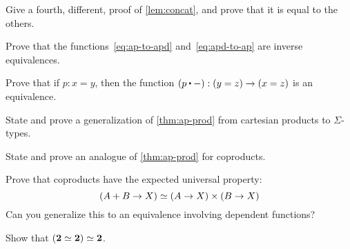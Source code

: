 \begin{ex}
  Give a fourth, different, proof of \autoref{lem:concat}, and prove that it is equal to the others.
\end{ex}

\begin{ex}
  Prove that the functions~\eqref{eq:ap-to-apd} and~\eqref{eq:apd-to-ap} are inverse equivalences.
\end{ex}

\begin{ex}\label{ex:equiv-concat}
  Prove that if $p:x=y$, then the function $(p\ct -):(y=z) \to (x=z)$ is an equivalence.
\end{ex}

\begin{ex}\label{ex:ap-sigma}
  State and prove a generalization of \autoref{thm:ap-prod} from cartesian products to $\Sigma$-types.
\end{ex}

\begin{ex}
  State and prove an analogue of \autoref{thm:ap-prod} for coproducts.
\end{ex}

\begin{ex}\label{ex:coprod-ump}
  Prove that coproducts have the expected universal property:
  \[ (A+B \to X) \simeq (A\to X)\times (B\to X) \]
  Can you generalize this to an equivalence involving dependent functions?
\end{ex}

\begin{ex}\label{ex:eqvboolbool}
  Show that $(\mathbf{2} \simeq \mathbf{2}) \simeq \mathbf{2}$.
\end{ex}

